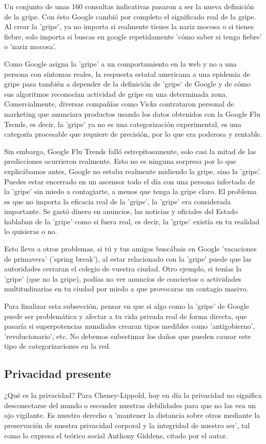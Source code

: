 \documentclass[11pt]{article}
\begin{document}
Un conjunto de unas 160 consultas indicativas pasaron a ser la nueva definición de la gripe. Con ésto Google cambió por completo el significado real de la gripe. Al crear la 'gripe', ya no importa si realmente tienes la nariz mocosa o si tienes fiebre, solo importa si buscas en google repetidamente 'cómo saber si tengo fiebre' o 'nariz mocosa'.

Como Google asigna la 'gripe' a un comportamiento en la web y no a una persona con síntomas reales, la respuesta estatal americana a una epidemia de gripe pasa también a depender de la definición de 'gripe' de Google y de cómo sus algoritmos reconocían actividad de gripe en una determinada zona. Comercialmente, diversas compañías como Vicks contrataron personal de marketing que anunciara productos usando los datos obtenidos con la Google Flu Trends, es decir, la 'gripe' ya no es una categorización experimental, es una categoría procesable que requiere de precisión, por lo que era poderosa y rentable.

Sin embargo, Google Flu Trends falló estrepitosamente, solo casi la mitad de las predicciones ocurrieron realmente. Esto no es ninguna sorpresa por lo que explicábamos antes, Google no estaba realmente midiendo la gripe, sino la 'gripe'. Puedes estar encerrado en un ascensor todo el día con una persona infectada de la 'gripe' sin miedo a contagiarte, a menos que tenga la gripe claro. El problema es que no importa la eficacia real de la 'gripe', la 'gripe' era considerada importante. Se gastó dinero en anuncios, las noticias y oficiales del Estado hablaban de la 'gripe' como si fuera real, es decir, la 'gripe' existía en tu realidad lo quisieras o no.

Esto lleva a otros problemas, si tú y tus amigos buscábais en Google 'vacaciones de primavera' ('spring break'), al estar relacionado con la 'gripe' puede que las autoridades cerraran el colegio de vuestra ciudad. Otro ejemplo, si tenías la 'gripe' (que no la gripe), podías no ver anuncios de conciertos o actividades multitudinarias en tu ciudad por miedo a que provocaras un contagio masivo.

Para finalizar esta subsección, pensar en que si algo como la 'gripe' de Google puede ser problemática y afectar a tu vida privada real de forma directa, que pasaría si superpotencias mundiales crearan tipos medibles como 'antigobierno', 'revolucionario', etc. No debemos subestimar los daños que pueden causar este tipo de categorizaciones en la red.
\subsection{Privacidad presente}
¿Qué es la privacidad? Para Cheney-Lippold, hoy en día la privacidad no significa desconectarse del mundo o esconder nuestras debilidades para que no las vea un ojo vigilante. Es nuestro derecho a 'mantener la distancia sobre otros mediante la preservación de nuestra privacidad corporal y la integridad de nuestro ser', tal como lo expresa el teórico social Anthony Giddens, citado por el autor. 
\end{document}
